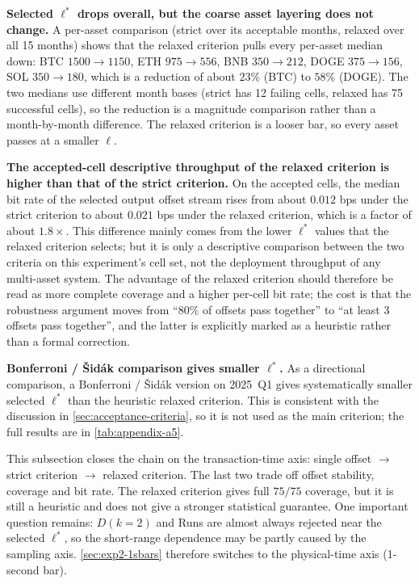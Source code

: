 \documentclass[11pt,titlepage,openany,oneside]{book}  %
\begin{document}
\textbf{Selected $\ell^*$ drops overall, but the coarse asset layering does not change.} A per-asset comparison (strict over its acceptable months, relaxed over all 15 months) shows that the relaxed criterion pulls every per-asset median down: BTC $1500 \to 1150$, ETH $975 \to 556$, BNB $350 \to 212$, DOGE $375 \to 156$, SOL $350 \to 180$, which is a reduction of about $23\%$ (BTC) to $58\%$ (DOGE). The two medians use different month bases (strict has 12 failing cells, relaxed has 75 successful cells), so the reduction is a magnitude comparison rather than a month-by-month difference. The relaxed criterion is a looser bar, so every asset passes at a smaller $\ell$.

\textbf{The accepted-cell descriptive throughput of the relaxed criterion is higher than that of the strict criterion.} On the accepted cells, the median bit rate of the selected output offset stream rises from about $0.012$ bps under the strict criterion to about $0.021$ bps under the relaxed criterion, which is a factor of about $1.8\times$. This difference mainly comes from the lower $\ell^*$ values that the relaxed criterion selects; but it is only a descriptive comparison between the two criteria on this experiment's cell set, not the deployment throughput of any multi-asset system. The advantage of the relaxed criterion should therefore be read as more complete coverage and a higher per-cell bit rate; the cost is that the robustness argument moves from ``$80\%$ of offsets pass together'' to ``at least 3 offsets pass together'', and the latter is explicitly marked as a heuristic rather than a formal correction.

\textbf{Bonferroni / \v{S}id\'ak comparison gives smaller $\ell^*$.} As a directional comparison, a Bonferroni / \v{S}id\'ak version on 2025~Q1 gives systematically smaller selected $\ell^*$ than the heuristic relaxed criterion. This is consistent with the discussion in \cref{sec:acceptance-criteria}, so it is not used as the main criterion; the full results are in \cref{tab:appendix-a5}.

This subsection closes the chain on the transaction-time axis: single offset $\to$ strict criterion $\to$ relaxed criterion. The last two trade off offset stability, coverage and bit rate. The relaxed criterion gives full $75/75$ coverage, but it is still a heuristic and does not give a stronger statistical guarantee. One important question remains: $D(k = 2)$ and Runs are almost always rejected near the selected $\ell^*$, so the short-range dependence may be partly caused by the sampling axis. \cref{sec:exp2-1sbars} therefore switches to the physical-time axis (1-second bar).
\end{document}
